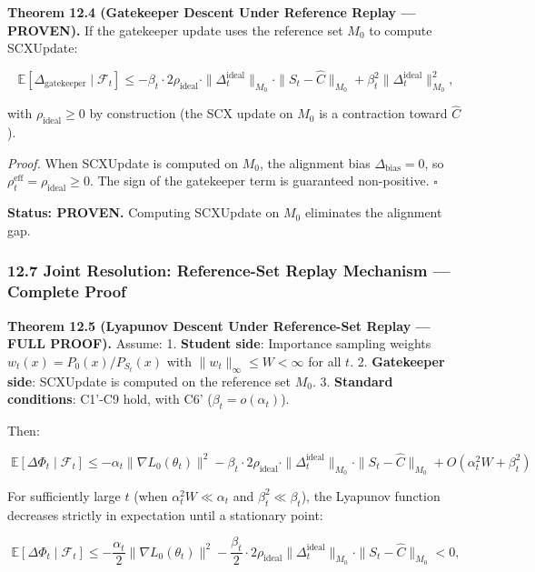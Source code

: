 \documentclass[
  12pt,
]{article}
\begin{document}
\textbf{Theorem 12.4 (Gatekeeper Descent Under Reference Replay ---
PROVEN).} If the gatekeeper update uses the reference set \(M_0\) to
compute SCXUpdate:

\[\mathbb{E}[\Delta_{\text{gatekeeper}} \mid \mathcal{F}_t] \leq -\beta_t \cdot 2\rho_{\text{ideal}} \cdot \|\Delta_t^{\text{ideal}}\|_{M_0} \cdot \|S_t - \hat{C}\|_{M_0} + \beta_t^2 \|\Delta_t^{\text{ideal}}\|_{M_0}^2,\]

with \(\rho_{\text{ideal}} \geq 0\) by construction (the SCX update on
\(M_0\) is a contraction toward \(\hat{C}\)).

\emph{Proof.} When SCXUpdate is computed on \(M_0\), the alignment bias
\(\Delta_{\text{bias}} = 0\), so
\(\rho_t^{\text{eff}} = \rho_{\text{ideal}} \geq 0\). The sign of the
gatekeeper term is guaranteed non-positive. \(\square\)

\textbf{Status: PROVEN.} Computing SCXUpdate on \(M_0\) eliminates the
alignment gap.

\subsubsection{12.7 Joint Resolution: Reference-Set Replay Mechanism ---
Complete
Proof}\label{joint-resolution-reference-set-replay-mechanism-complete-proof}

\textbf{Theorem 12.5 (Lyapunov Descent Under Reference-Set Replay ---
FULL PROOF).} Assume: 1. \textbf{Student side}: Importance sampling
weights \(w_t(x) = P_0(x)/P_{S_t}(x)\) with
\(\|w_t\|_\infty \leq W < \infty\) for all \(t\). 2. \textbf{Gatekeeper
side}: SCXUpdate is computed on the reference set \(M_0\). 3.
\textbf{Standard conditions}: C1'-C9 hold, with C6'
(\(\beta_t = o(\alpha_t)\)).

Then:

\[\boxed{\;\mathbb{E}[\Delta\Phi_t \mid \mathcal{F}_t] \leq -\alpha_t \|\nabla L_0(\theta_t)\|^2 - \beta_t \cdot 2\rho_{\text{ideal}} \cdot \|\Delta_t^{\text{ideal}}\|_{M_0} \cdot \|S_t - \hat{C}\|_{M_0} + O(\alpha_t^2 W + \beta_t^2)\;}\]

For sufficiently large \(t\) (when \(\alpha_t^2 W \ll \alpha_t\) and
\(\beta_t^2 \ll \beta_t\)), the Lyapunov function decreases strictly in
expectation until a stationary point:

\[\mathbb{E}[\Delta\Phi_t \mid \mathcal{F}_t] \leq -\frac{\alpha_t}{2} \|\nabla L_0(\theta_t)\|^2 - \frac{\beta_t}{2} \cdot 2\rho_{\text{ideal}} \|\Delta_t^{\text{ideal}}\|_{M_0} \cdot \|S_t - \hat{C}\|_{M_0} < 0,\]
\end{document}
